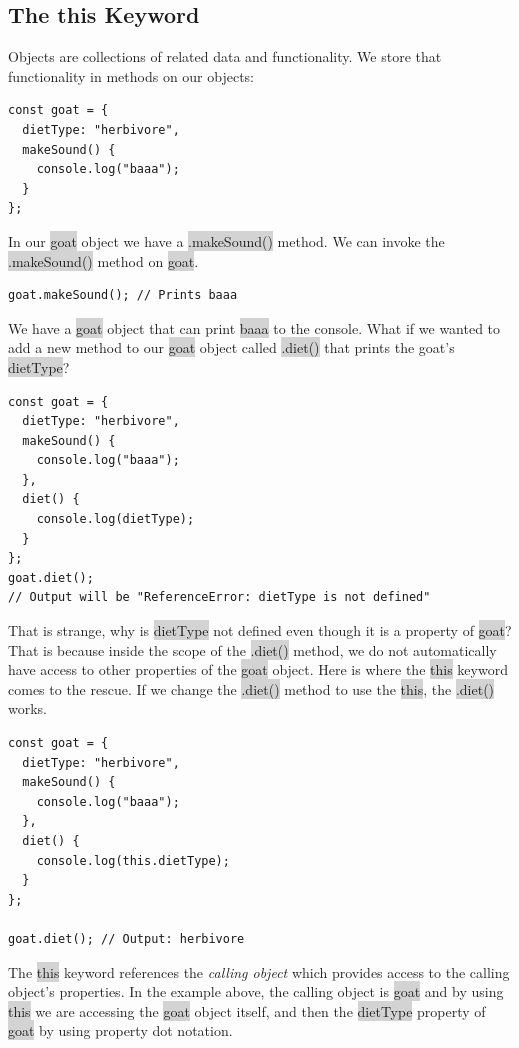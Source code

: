 \documentclass[11pt]{article}
\begin{document}
\subsection{The this Keyword}
Objects are collections of related data and functionality. We store that functionality in methods on our objects:
\begin{lstlisting}
const goat = {
  dietType: "herbivore",
  makeSound() {
    console.log("baaa");
  }
};
\end{lstlisting}
In our \colorbox{lightgray}{goat} object we have a \colorbox{lightgray}{.makeSound()} method. We can invoke the \colorbox{lightgray}{.makeSound()} method on \colorbox{lightgray}{goat}.
\begin{lstlisting}
goat.makeSound(); // Prints baaa
\end{lstlisting}
We have a \colorbox{lightgray}{goat} object that can print \colorbox{lightgray}{baaa} to the console. What if we wanted to add a new method to our \colorbox{lightgray}{goat} object called \colorbox{lightgray}{.diet()} that prints the goat's \colorbox{lightgray}{dietType}?
\begin{lstlisting}
const goat = {
  dietType: "herbivore",
  makeSound() {
    console.log("baaa");
  },
  diet() {
    console.log(dietType);
  }
};
goat.diet(); 
// Output will be "ReferenceError: dietType is not defined"
\end{lstlisting}
That is strange, why is \colorbox{lightgray}{dietType} not defined even though it is a property of \colorbox{lightgray}{goat}? That is because inside the scope of the \colorbox{lightgray}{.diet()} method, we do not automatically have access to other properties of the \colorbox{lightgray}{goat} object. Here is where the \colorbox{lightgray}{this} keyword comes to the rescue. If we change the \colorbox{lightgray}{.diet()} method to use the \colorbox{lightgray}{this}, the \colorbox{lightgray}{.diet()} works. 
\begin{lstlisting}
const goat = {
  dietType: "herbivore",
  makeSound() {
    console.log("baaa");
  },
  diet() {
    console.log(this.dietType);
  }
};

goat.diet(); // Output: herbivore
\end{lstlisting}
The \colorbox{lightgray}{this} keyword references the \textit{calling object} which provides access to the calling object’s properties. In the example above, the calling object is \colorbox{lightgray}{goat} and by using \colorbox{lightgray}{this} we are accessing the \colorbox{lightgray}{goat} object itself, and then the \colorbox{lightgray}{dietType} property of \colorbox{lightgray}{goat} by using property dot notation.
\end{document}
